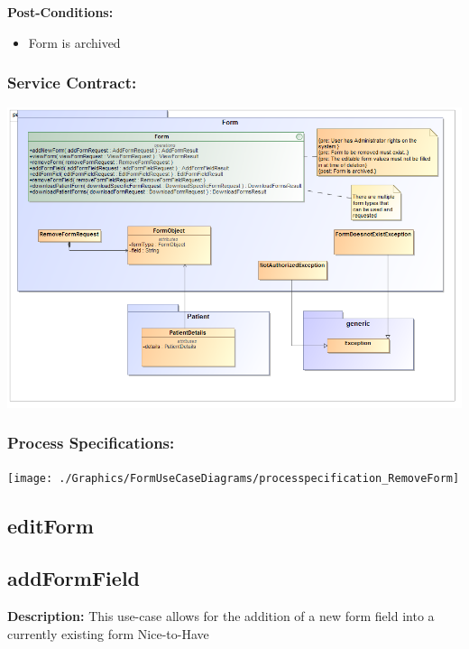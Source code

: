 \textbf{Post-Conditions:}	
\begin{itemize}
	\item Form is archived
\end{itemize}
\subsubsection{Service Contract:} 
\includegraphics[width=1\linewidth]{./Graphics/FormUseCaseDiagrams/removeForm_ServiceContract}
\subsubsection{Process Specifications:} 
\texttt{[image: ./Graphics/FormUseCaseDiagrams/processpecification\_RemoveForm]}







\subsection{editForm}
\subsection{addFormField}
\textbf{Description:}
This use-case allows for the addition of a new form field into a currently existing form
Nice-to-Have

